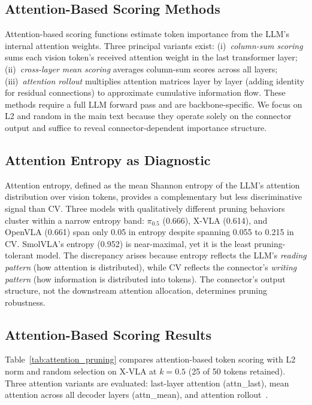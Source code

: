 \subsection{Attention-Based Scoring Methods}
\label{app:attention_scoring}
\label{app:attention_pruning}

Attention-based scoring functions estimate token importance from the LLM's internal attention weights. Three principal variants exist: (i)~\emph{column-sum scoring} sums each vision token's received attention weight in the last transformer layer; (ii)~\emph{cross-layer mean scoring} averages column-sum scores across all layers; (iii)~\emph{attention rollout} multiplies attention matrices layer by layer (adding identity for residual connections) to approximate cumulative information flow. These methods require a full LLM forward pass and are backbone-specific. We focus on L2 and random in the main text because they operate solely on the connector output and suffice to reveal connector-dependent importance structure.

\subsection{Attention Entropy as Diagnostic}
\label{app:attention_entropy}

Attention entropy, defined as the mean Shannon entropy of the LLM's attention distribution over vision tokens, provides a complementary but less discriminative signal than CV. Three models with qualitatively different pruning behaviors cluster within a narrow entropy band: $\pi_{0.5}$ (0.666), X-VLA (0.614), and OpenVLA (0.661) span only 0.05 in entropy despite spanning 0.055 to 0.215 in CV. SmolVLA's entropy (0.952) is near-maximal, yet it is the least pruning-tolerant model. The discrepancy arises because entropy reflects the LLM's \emph{reading pattern} (how attention is distributed), while CV reflects the connector's \emph{writing pattern} (how information is distributed into tokens). The connector's output structure, not the downstream attention allocation, determines pruning robustness.

\subsection{Attention-Based Scoring Results}

Table~\ref{tab:attention_pruning} compares attention-based token scoring with L2 norm and random selection on X-VLA at $k{=}0.5$ (25 of 50 tokens retained). Three attention variants are evaluated: last-layer attention (attn\_last), mean attention across all decoder layers (attn\_mean), and attention rollout~\cite{abnar2020quantifying}.

